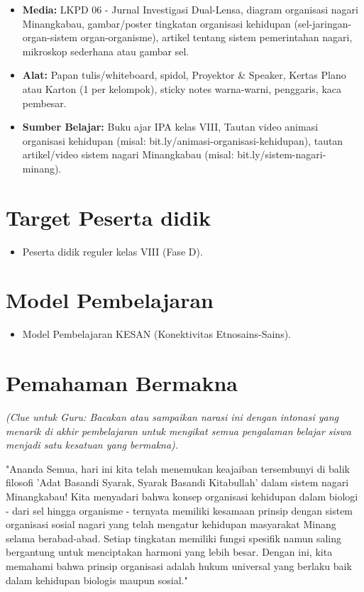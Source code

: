 \documentclass[a4paper,12pt]{article}
\begin{document}
\begin{itemize}
\item \textbf{Media:} LKPD 06 - Jurnal Investigasi Dual-Lensa, diagram organisasi nagari Minangkabau, gambar/poster tingkatan organisasi kehidupan (sel-jaringan-organ-sistem organ-organisme), artikel tentang sistem pemerintahan nagari, mikroskop sederhana atau gambar sel.
\item \textbf{Alat:} Papan tulis/whiteboard, spidol, Proyektor \& Speaker, Kertas Plano atau Karton (1 per kelompok), sticky notes warna-warni, penggaris, kaca pembesar.
\item \textbf{Sumber Belajar:} Buku ajar IPA kelas VIII, Tautan video animasi organisasi kehidupan (misal: bit.ly/animasi-organisasi-kehidupan), tautan artikel/video sistem nagari Minangkabau (misal: bit.ly/sistem-nagari-minang).
\end{itemize}

\section{Target Peserta didik}

\begin{itemize}
\item Peserta didik reguler kelas VIII (Fase D).
\end{itemize}

\section{Model Pembelajaran}

\begin{itemize}
\item Model Pembelajaran KESAN (Konektivitas Etnosains-Sains).
\end{itemize}

\section{Pemahaman Bermakna}
\textit{(Clue untuk Guru: Bacakan atau sampaikan narasi ini dengan intonasi yang menarik di akhir pembelajaran untuk mengikat semua pengalaman belajar siswa menjadi satu kesatuan yang bermakna).}

\begin{tcolorbox}[sectionbox]
"Ananda Semua, hari ini kita telah menemukan keajaiban tersembunyi di balik filosofi 'Adat Basandi Syarak, Syarak Basandi Kitabullah' dalam sistem nagari Minangkabau! Kita menyadari bahwa konsep organisasi kehidupan dalam biologi - dari sel hingga organisme - ternyata memiliki kesamaan prinsip dengan sistem organisasi sosial nagari yang telah mengatur kehidupan masyarakat Minang selama berabad-abad. Setiap tingkatan memiliki fungsi spesifik namun saling bergantung untuk menciptakan harmoni yang lebih besar. Dengan ini, kita memahami bahwa prinsip organisasi adalah hukum universal yang berlaku baik dalam kehidupan biologis maupun sosial."
\end{tcolorbox}
\end{document}
